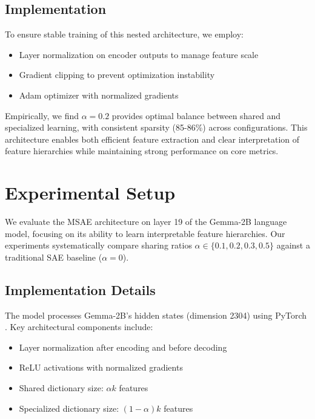 \documentclass{article} %
\begin{document}
\subsection{Implementation}

To ensure stable training of this nested architecture, we employ:
\begin{itemize}
    \item Layer normalization on encoder outputs to manage feature scale
    \item Gradient clipping to prevent optimization instability
    \item Adam optimizer with normalized gradients
\end{itemize}

Empirically, we find $\alpha=0.2$ provides optimal balance between shared and specialized learning, with consistent sparsity (85-86\%) across configurations. This architecture enables both efficient feature extraction and clear interpretation of feature hierarchies while maintaining strong performance on core metrics.

\section{Experimental Setup}
\label{sec:experimental}

We evaluate the MSAE architecture on layer 19 of the Gemma-2B language model, focusing on its ability to learn interpretable feature hierarchies. Our experiments systematically compare sharing ratios $\alpha \in \{0.1, 0.2, 0.3, 0.5\}$ against a traditional SAE baseline ($\alpha=0$).

\subsection{Implementation Details}
The model processes Gemma-2B's hidden states (dimension 2304) using PyTorch \cite{paszke2019pytorch}. Key architectural components include:
\begin{itemize}
    \item Layer normalization after encoding and before decoding
    \item ReLU activations with normalized gradients
    \item Shared dictionary size: $\alpha k$ features
    \item Specialized dictionary size: $(1-\alpha)k$ features
\end{itemize}
\end{document}
